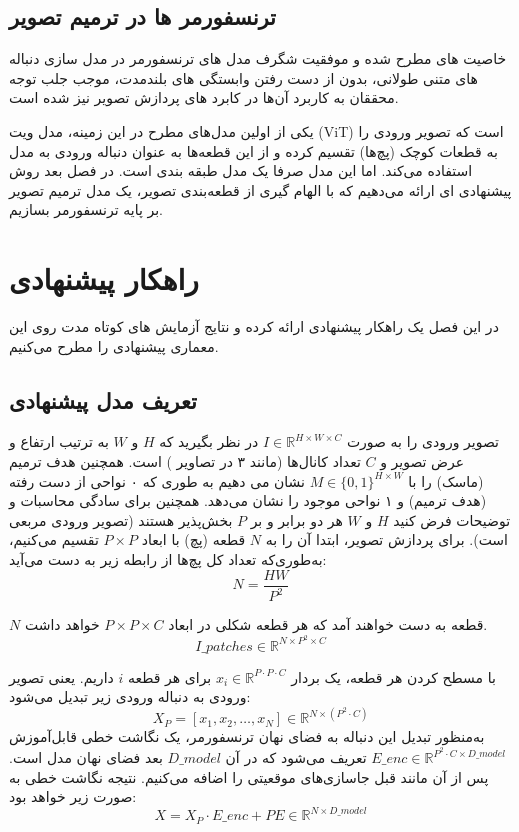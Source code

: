 \section{ترنسفورمر ها در ترمیم تصویر}

خاصیت های مطرح شده و موفقیت شگرف مدل های ترنسفورمر
\cite{radfordLanguageModelsAre2019}
\cite{brownLanguageModelsAre2020}
\cite{openaiGPT4TechnicalReport2024}
در مدل سازی دنباله های متنی طولانی، بدون از دست رفتن وابستگی های بلندمدت، موجب جلب توجه محققان به کاربرد آن‌ها در کابرد های پردازش تصویر نیز شده است.
\cite{liuSwinTransformerHierarchical2021}


یکی از اولین مدل‌های مطرح در این زمینه، مدل ویت (ViT) 
\cite{dosovitskiyImageWorth16x162021}
است که تصویر ورودی را به قطعات کوچک (پچ‌ها) تقسیم کرده و از این قطعه‌ها به عنوان دنباله ورودی به مدل استفاده می‌کند. اما این مدل صرفا یک مدل طبقه بندی است. در فصل بعد روش پیشنهادی ای ارائه می‌دهیم که با الهام گیری از قطعه‌بندی تصویر، یک مدل ترمیم تصویر بر پایه ترنسفورمر بسازیم. 



\chapter{راهکار پیشنهادی}

در این فصل یک راهکار پیشنهادی ارائه کرده و نتایج آزمایش های کوتاه مدت روی این معماری پیشنهادی را مطرح می‌کنیم.

\section{تعریف مدل پیشنهادی}

تصویر ورودی را به صورت $I \in \mathbb{R}^{H \times W \times C}$ در نظر بگیرید که $H$ و $W$ به ترتیب ارتفاع و عرض تصویر و $C$ تعداد کانال‌ها (مانند ۳ در تصاویر ) است. همچنین هدف ترمیم (ماسک) را با
$M \in \{0,1\}^{H \times W} $
نشان می دهیم به طوری که ۰ نواحی از دست رفته (هدف ترمیم) و ۱ نواحی موجود را نشان می‌دهد. همچنین برای سادگی محاسبات و توضیحات فرض کنید $H$ و‌ $W$ هر دو برابر و بر $P$ بخش‌پذیر هستند (تصویر ورودی مربعی است). برای پردازش تصویر، ابتدا آن را به $N$ قطعه (پچ) با ابعاد $P \times P$ تقسیم می‌کنیم، به‌طوری‌که تعداد کل پچ‌ها از رابطه زیر به دست می‌آید:
$$
N = \frac{HW}{P^2}
$$

$N$
قطعه به دست خواهند آمد که هر قطعه شکلی در ابعاد ${P \times P \times C}$ خواهد داشت.
$$
I\_{patches} \in \mathbb{R}^{N \times P^2 \times C}
$$

 با مسطح کردن هر قطعه، یک بردار 
$x_i \in \mathbb{R}^{P \cdot P \cdot C}$
برای هر قطعه $i$ داریم. یعنی تصویر ورودی به دنباله ورودی زیر تبدیل می‌شود:
\[
X_P = [x_1, x_2, \dots, x_N] \in \mathbb{R}^{N \times (P^2 \cdot C)}
\]
به‌منظور تبدیل این دنباله به فضای نهان ترنسفورمر، یک نگاشت خطی قابل‌آموزش $E\_{enc} \in \mathbb{R}^{P^2 \cdot C \times D\_{model}}$ تعریف می‌شود که در آن $D\_{model}$ بعد فضای نهان مدل است. پس از آن مانند قبل جاسازی‌های موقعیتی را اضافه می‌کنیم.
 نتیجه نگاشت خطی به صورت زیر خواهد بود:
$$
X = X_P \cdot E\_{enc} + PE \in \mathbb{R}^{N \times D\_{model}}
$$

